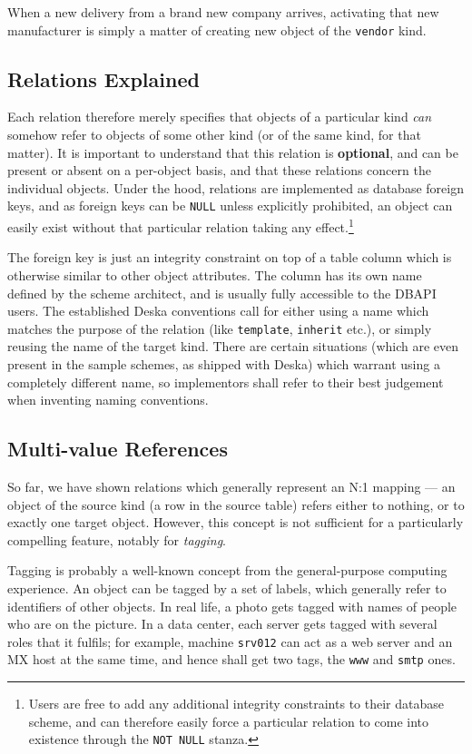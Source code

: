\documentclass[deska]{subfiles}
\begin{document}
When a new delivery from a brand new company arrives, activating that new manufacturer is simply a matter of
creating new object of the {\tt vendor} kind.

\subsection{Relations Explained}

Each relation therefore merely specifies that objects of a particular kind {\em can} somehow refer to objects of some
other kind (or of the same kind, for that matter).  It is important to understand that this relation is {\bf optional},
and can be present or absent on a per-object basis, and that these relations concern the individual objects.  Under the
hood, relations are implemented as database foreign keys, and as foreign keys can be {\tt NULL} unless explicitly
prohibited, an object can easily exist without that particular relation taking any effect.\footnote{Users are free to
add any additional integrity constraints to their database scheme, and can therefore easily force a particular relation
to come into existence through the {\tt NOT NULL} stanza.}

The foreign key is just an integrity constraint on top of a table column which is otherwise similar to other object
attributes.  The column has its own name defined by the scheme architect, and is usually fully accessible to the DBAPI
users.  The established Deska conventions call for either using a name which matches the purpose of the relation (like
{\tt template}, {\tt inherit} etc.), or simply reusing the name of the target kind.  There are certain situations (which
are even present in the sample schemes, as shipped with Deska) which warrant using a completely different name, so
implementors shall refer to their best judgement when inventing naming conventions.

\subsection{Multi-value References}

So far, we have shown relations which generally represent an N:1 mapping --- an object of the source kind (a row in the
source table) refers either to nothing, or to exactly one target object.  However, this concept is not sufficient for a
particularly compelling feature, notably for {\em tagging}.

Tagging is probably a well-known concept from the general-purpose computing experience. An object can be tagged by a set
of labels, which generally refer to identifiers of other objects.  In real life, a photo gets tagged with names of
people who are on the picture.  In a data center, each server gets tagged with several roles that it fulfils; for
example, machine {\tt srv012} can act as a web server and an MX host at the same time, and hence shall get two tags, the
{\tt www} and {\tt smtp} ones.
\end{document}
